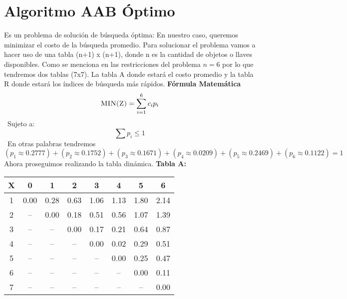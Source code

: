 \documentclass[10pt,letterpaper]{article}
\begin{document}
\section{Algoritmo AAB Óptimo} 
        Es un problema de solución de búsqueda óptima:  
        En nuestro caso, queremos minimizar el costo de la búsqueda promedio. 
        Para solucionar el problema vamos a hacer uso de una tabla (n+1) x (n+1), donde n es la cantidad 
        de objetos o llaves disponibles. 
        Como se menciona en las restricciones del problema $n = 6$ por lo que tendremos 
        dos tablas (7x7). La tabla A donde estará el costo promedio y la tabla R donde estará 
        los índices de búsqueda más rápidos. \newline \newline \newline 
        \textbf{\Large Fórmula Matemática} 
        \[ \textsc{\normalsize MIN(Z)}\\[0.5cm] = \sum_{i=1}^{6}c_{i}p_{i} \] 
        \ Sujeto a:  
        \[ \sum p_{i} \leq 1 \] 
        \ En otras palabras tendremos 
\[ (p_{1} \approx 0.2777)+(p_{2} \approx 0.1752)+(p_{3} \approx 0.1671)+(p_{4} \approx 0.0209)+(p_{5} \approx 0.2469)+(p_{6} \approx 0.1122) = 1 \]
\newline Ahora proseguimos realizando la tabla dinámica.
\newline \newline \newline \textbf{Tabla A: }
\begin{center}
\begin{tabu} to 1.0\textwidth { | c | c | c | c | c | c | c | c | }
\hline
{}\color{black}\textbf{X} & \color{black}\textbf{0} & \color{black}\textbf{1} & \color{black}\textbf{2} & \color{black}\textbf{3} & \color{black}\textbf{4} & \color{black}\textbf{5} & \color{black}\textbf{6} \\ 
\hline
{}\color{black}1 & 0.00 & 0.28 & 0.63 & 1.06 & 1.13 & 1.80 & 2.14 \\ 
\hline
{}\color{black}2 &  --  & 0.00 & 0.18 & 0.51 & 0.56 & 1.07 & 1.39 \\ 
\hline
{}\color{black}3 &  --  &  --  & 0.00 & 0.17 & 0.21 & 0.64 & 0.87 \\ 
\hline
{}\color{black}4 &  --  &  --  &  --  & 0.00 & 0.02 & 0.29 & 0.51 \\ 
\hline
{}\color{black}5 &  --  &  --  &  --  &  --  & 0.00 & 0.25 & 0.47 \\ 
\hline
{}\color{black}6 &  --  &  --  &  --  &  --  &  --  & 0.00 & 0.11 \\ 
\hline
{}\color{black}7 &  --  &  --  &  --  &  --  &  --  &  --  & 0.00 \\ 
\hline
\end{tabu} \\
\end{center}
\end{document}
